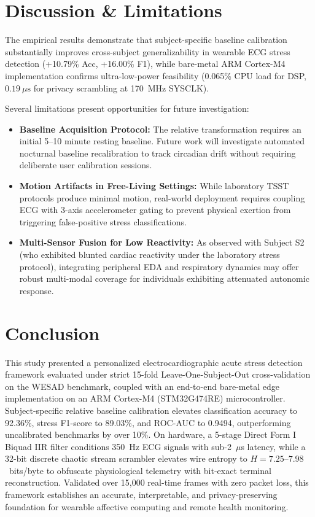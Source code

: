 \documentclass[conference]{IEEEtran}
\begin{document}
\section{Discussion \& Limitations}
The empirical results demonstrate that subject-specific baseline calibration substantially improves cross-subject generalizability in wearable ECG stress detection (+10.79\% Acc, +16.00\% F1), while bare-metal ARM Cortex-M4 implementation confirms ultra-low-power feasibility (0.065\% CPU load for DSP, $0.19~\mu\text{s}$ for privacy scrambling at 170~MHz SYSCLK).

Several limitations present opportunities for future investigation:
\begin{itemize}
    \item \textbf{Baseline Acquisition Protocol:} The relative transformation requires an initial 5--10 minute resting baseline. Future work will investigate automated nocturnal baseline recalibration to track circadian drift without requiring deliberate user calibration sessions.
    \item \textbf{Motion Artifacts in Free-Living Settings:} While laboratory TSST protocols produce minimal motion, real-world deployment requires coupling ECG with 3-axis accelerometer gating to prevent physical exertion from triggering false-positive stress classifications.
    \item \textbf{Multi-Sensor Fusion for Low Reactivity:} As observed with Subject S2 (who exhibited blunted cardiac reactivity under the laboratory stress protocol), integrating peripheral EDA and respiratory dynamics may offer robust multi-modal coverage for individuals exhibiting attenuated autonomic response.
\end{itemize}

\section{Conclusion}
This study presented a personalized electrocardiographic acute stress detection framework evaluated under strict 15-fold Leave-One-Subject-Out cross-validation on the WESAD benchmark, coupled with an end-to-end bare-metal edge implementation on an ARM Cortex-M4 (STM32G474RE) microcontroller. Subject-specific relative baseline calibration elevates classification accuracy to 92.36\%, stress F1-score to 89.03\%, and ROC-AUC to 0.9494, outperforming uncalibrated benchmarks by over 10\%. On hardware, a 5-stage Direct Form I Biquad IIR filter conditions 350~Hz ECG signals with sub-2~$\mu$s latency, while a 32-bit discrete chaotic stream scrambler elevates wire entropy to $H = 7.25\text{--}7.98$~bits/byte to obfuscate physiological telemetry with bit-exact terminal reconstruction. Validated over 15,000 real-time frames with zero packet loss, this framework establishes an accurate, interpretable, and privacy-preserving foundation for wearable affective computing and remote health monitoring.



\end{document}
